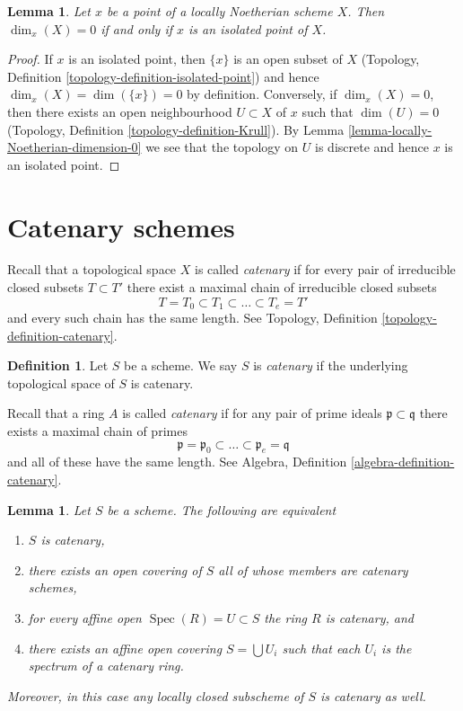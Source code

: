 \documentclass{stacks-project}
\theoremstyle{plain}
\newtheorem{lemma}[subsection]{Lemma}
\theoremstyle{definition}
\newtheorem{definition}[subsection]{Definition}
\theoremstyle{remark}
\numberwithin{equation}{subsection}
\def\Spec{\mathop{\mathrm{Spec}}}
\begin{document}
\begin{lemma}
\label{lemma-isolated-dim-0-locally-noetherian}
Let $x$ be a point of a locally Noetherian scheme $X$.
Then $\dim_x(X) = 0$ if and only if $x$ is an isolated point of $X$.
\end{lemma}

\begin{proof}
If $x$ is an isolated point, then $\{x\}$ is an open subset of $X$
(Topology, Definition \ref{topology-definition-isolated-point})
and hence $\dim_x(X) = \dim(\{x\}) = 0$ by definition. Conversely, if
$\dim_x(X) = 0$, then there exists an open neighbourhood $U \subset X$
of $x$ such that $\dim(U) = 0$
(Topology, Definition \ref{topology-definition-Krull}).
By Lemma \ref{lemma-locally-Noetherian-dimension-0}
we see that the topology on $U$ is discrete and hence
$x$ is an isolated point.
\end{proof}





\section{Catenary schemes}
\label{section-catenary}

\noindent
Recall that a topological space $X$ is called {\it catenary} if
for every pair of irreducible closed subsets $T \subset T'$
there exist a maximal chain of irreducible closed subsets
$$
T = T_0 \subset T_1 \subset \ldots \subset T_e = T'
$$
and every such chain has the same length. See
Topology, Definition \ref{topology-definition-catenary}.

\begin{definition}
\label{definition-catenary}
Let $S$ be a scheme. We say $S$ is {\it catenary} if the
underlying topological space of $S$ is catenary.
\end{definition}

\noindent
Recall that a ring $A$ is called {\it catenary} if
for any pair of prime ideals $\mathfrak p \subset \mathfrak q$
there exists a maximal chain of primes
$$
\mathfrak p =
\mathfrak p_0 \subset \ldots \subset \mathfrak p_e
= \mathfrak q
$$
and all of these have the same length. See
Algebra, Definition \ref{algebra-definition-catenary}.

\begin{lemma}
\label{lemma-catenary-local}
Let $S$ be a scheme. The following are equivalent
\begin{enumerate}
\item $S$ is catenary,
\item there exists an open covering of $S$ all of whose members are
catenary schemes,
\item for every affine open $\Spec(R) = U \subset S$ the ring
$R$ is catenary, and
\item there exists an affine open covering $S = \bigcup U_i$ such
that each $U_i$ is the spectrum of a catenary ring.
\end{enumerate}
Moreover, in this case any locally closed subscheme of $S$ is catenary
as well.
\end{lemma}
\end{document}

